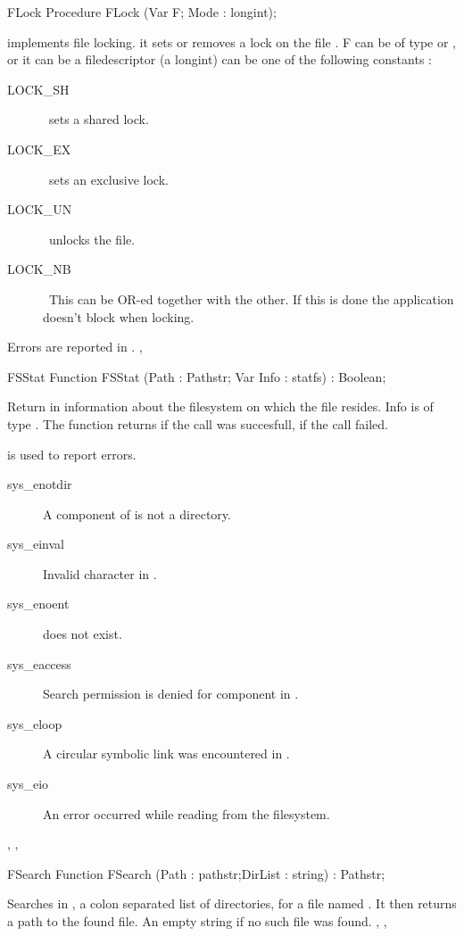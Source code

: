 \begin{procedure}{FLock}
\Declaration
Procedure FLock (Var F; Mode : longint);

\Description
{} implements file locking. it sets or removes a lock on the file
. F can be of type  or , or it can be a \linux
filedescriptor (a longint)
 can be one of the following constants :
\begin{description}
\item [LOCK\_SH] \ sets a shared lock.
\item [LOCK\_EX] \ sets an exclusive lock.
\item [LOCK\_UN] \ unlocks the file.
\item [LOCK\_NB] \ This can be OR-ed together with the other. If this is done
the application doesn't block when locking.
\end{description}

\Errors
Errors are reported in .
\SeeAlso
{}, 
\end{procedure}
\begin{function}{FSStat}
\Declaration
Function FSStat (Path : Pathstr; Var Info : statfs) : Boolean;

\Description
 Return in  information about the filesystem on which the file
 resides. Info is of type .
The function returns  if the call was succesfull,  if the call
failed.

\Errors
  is used to report errors.
\begin{description}
\item[sys\_enotdir] A component of  is not a directory.
\item[sys\_einval] Invalid character in .
\item[sys\_enoent]  does not exist.
\item[sys\_eaccess] Search permission is denied for  component in
.
\item[sys\_eloop] A circular symbolic link was encountered in .
\item[sys\_eio] An error occurred while reading from the filesystem.
\end{description}

\SeeAlso
{}, , 
\end{function}
\begin{function}{FSearch}
\Declaration
Function FSearch (Path : pathstr;DirList : string) : Pathstr;

\Description
 Searches in , a colon separated list of directories,
for a file named . It then returns a path to the found file.
\Errors
An empty string if no such file was found.
\SeeAlso
{}, ,  
\end{function}
